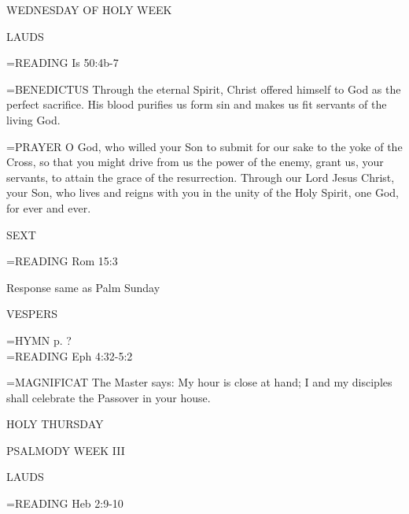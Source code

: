 \begin{center}
\normalsize WEDNESDAY OF HOLY WEEK
\end{center}

\begin{flushleft}\normalsize LAUDS\\\end{flushleft}
\hangindent=\parindent \small{READING}    Is 50:4b-7 \textbf{   \\}

\hangindent=\parindent \small{BENEDICTUS 	Through the eternal Spirit, Christ offered himself to God as the perfect sacrifice. His blood purifies us form sin and makes us fit servants of the living God.\\}

\hangindent=\parindent \small{PRAYER 	O God, who willed your Son to submit for our sake to the yoke of the Cross, so that you might drive from us the power of the enemy, grant us, your servants, to attain the grace of the resurrection. Through our Lord Jesus Christ, your Son, who lives and reigns with you in the unity of the Holy Spirit, one God, for ever and ever.}

\begin{flushleft}\normalsize SEXT\\\end{flushleft}
\hangindent=\parindent \small{READING}    Rom 15:3 \textbf{   }

Response same as Palm Sunday

\begin{flushleft}\normalsize VESPERS\\\end{flushleft}
\hangindent=\parindent \small{\uppercase{HYMN} p.  ?\\}
\hangindent=\parindent \small{READING}    Eph 4:32-5:2 \textbf{   \\}

\hangindent=\parindent \small{MAGNIFICAT 	The Master says: My hour is close at hand; I and my disciples shall celebrate the Passover in your house.\\}

\begin{center}
\normalsize HOLY THURSDAY
\end{center}
PSALMODY WEEK III

\begin{flushleft}\normalsize LAUDS\\\end{flushleft}
\hangindent=\parindent \small{READING}    Heb 2:9-10 \textbf{   \\}


